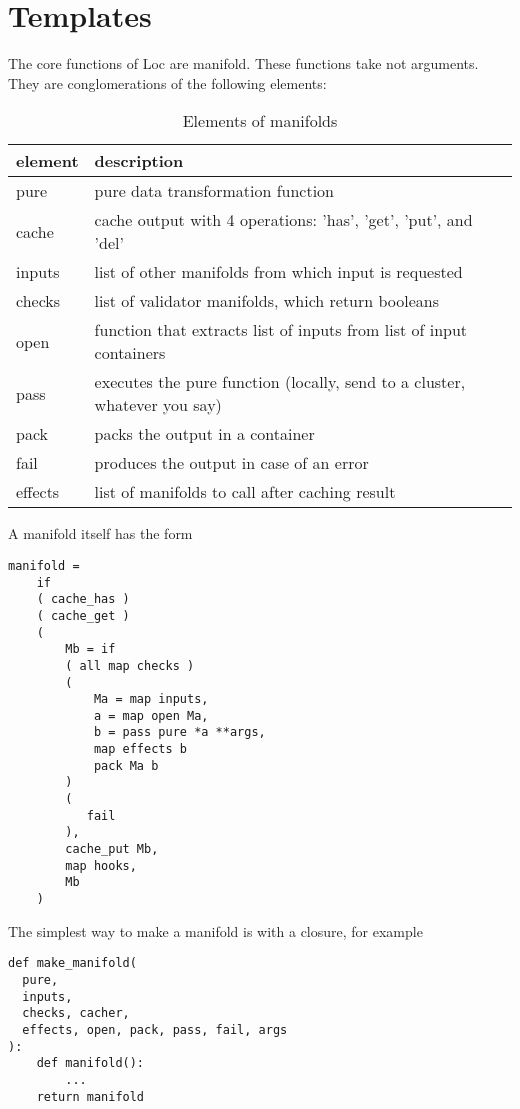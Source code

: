 \documentclass[12pt]{article}
\begin{document}
\section{Templates}

The core functions of Loc are manifold. These functions take not arguments.
They are conglomerations of the following elements:

\begin{table}[htpb]
  \centering
  \caption{Elements of manifolds}
  \label{tab:elements_of_manifolds}
  \begin{tabular}{l|l}
element & description \\
\hline
pure    & pure data transformation function                                         \\
cache   & cache output with 4 operations: 'has', 'get', 'put', and 'del'            \\
inputs  & list of other manifolds from which input is requested                     \\
checks  & list of validator manifolds, which return booleans                        \\
open    & function that extracts list of inputs from list of input containers       \\
pass    & executes the pure function (locally, send to a cluster, whatever you say) \\
pack    & packs the output in a container                                           \\
fail    & produces the output in case of an error                                   \\
effects & list of manifolds to call after caching result
  \end{tabular}
\end{table}

A manifold itself has the form

\begin{verbatim}
manifold =
    if
    ( cache_has )
    ( cache_get )
    ( 
        Mb = if
        ( all map checks )
        (
            Ma = map inputs,
            a = map open Ma,
            b = pass pure *a **args,
            map effects b 
            pack Ma b
        )
        (
           fail
        ),
        cache_put Mb,
        map hooks,
        Mb
    )
\end{verbatim}

The simplest way to make a manifold is with a closure, for example

\begin{verbatim}
def make_manifold(
  pure,
  inputs,
  checks, cacher,
  effects, open, pack, pass, fail, args
):
    def manifold():
        ...
    return manifold
\end{verbatim}
\end{document}
